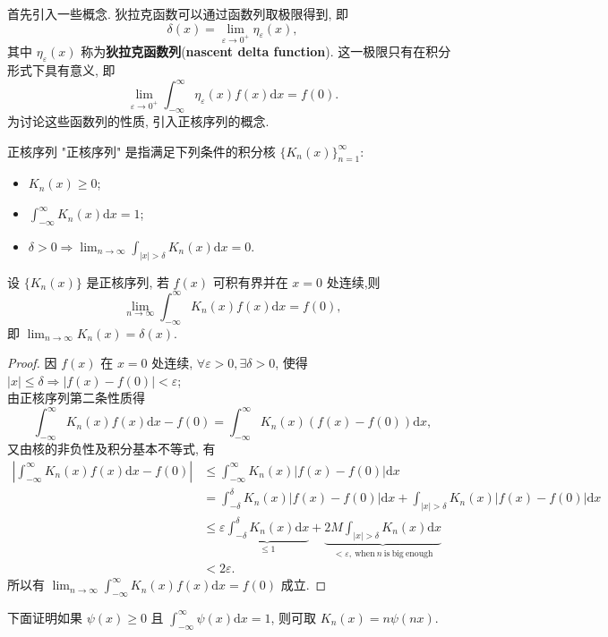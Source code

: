 首先引入一些概念. 狄拉克函数可以通过函数列取极限得到, 即
\begin{equation}
    \delta(x)=\lim_{\varepsilon\to 0^+}\eta_\varepsilon (x),
\end{equation}
其中 $\eta_\varepsilon(x)$ 称为\textbf{狄拉克函数列}(\textbf{nascent delta function}). 这一极限只有在积分形式下具有意义, 即
\begin{equation}
    \lim_{\varepsilon\to 0^+}\int_{-\infty}^{\infty}\eta_\varepsilon(x)f(x)\mathrm{d}x=f(0).
\end{equation} 
为讨论这些函数列的性质, 引入正核序列的概念.
\begin{definition}{正核序列}{}
    "正核序列" 是指满足下列条件的积分核 $\displaystyle{\{ K_n(x) \}_{n=1}^\infty}$:
    \begin{itemize}
        \item $\displaystyle{K_n(x)\ge 0}$;
        \item $\displaystyle{\int_{-\infty}^\infty K_n(x)\mathrm{d}x=1}$;
        \item $\displaystyle{\delta>0\Rightarrow\lim_{n\to\infty}\int_{|x|>\delta}K_n(x)\mathrm{d}x=0}$.
    \end{itemize}
\end{definition}
\begin{theorem}{}{}
    设 $\{K_n(x)\}$ 是正核序列, 若 $f(x)$ 可积有界并在 $x=0$ 处连续,则
    \begin{equation}
        \lim_{n\to\infty}\int_{-\infty}^\infty K_n(x)f(x)\mathrm{d}x=f(0),
    \end{equation}
    即 $\displaystyle{\lim_{n\to \infty}K_n(x)=\delta(x)}$.
\end{theorem}
\begin{proof}{}{}
    因 $f(x)$ 在 $x=0$ 处连续, $\forall \varepsilon>0,\exists\delta>0$, 使得 $|x|\le \delta\Rightarrow|f(x)-f(0) |<\varepsilon$;
\\由正核序列第二条性质得
    \begin{equation}
        \int_{-\infty}^{\infty}K_n(x)f(x)\mathrm{d}x-f(0)=\int_{-\infty}^\infty K_n(x)\left( f(x)-f(0) \right) \mathrm{d}x,
    \end{equation}
    又由核的非负性及积分基本不等式, 有
      \begin{align}
            \left| \int_{-\infty}^\infty K_n(x)f(x)\mathrm{d}x-f(0) \right|&\leqslant \int_{-\infty}^{\infty}K_n(x)|f(x)-f(0) |\mathrm{d}x\nonumber\\
            &=\int_{-\delta}^\delta K_n(x)|f(x)-f(0) |\mathrm{d}x+\int_{|x|>\delta}K_n(x)|f(x)-f(0) |\mathrm{d}x\nonumber\\
            &\leqslant \varepsilon \underbrace{\int_{-\delta}^\delta K_n(x)\mathrm{d}x}_{\leqslant 1} +\underbrace{2M\int_{|x|>\delta}K_n(x)\mathrm{d}x}_{<\varepsilon,~ \mathrm{when~}n\mathrm{~is~big~enough}}\nonumber\\
            &<2\varepsilon.
        \end{align}
    所以有 $\displaystyle{\lim_{n\to\infty}\int_{-\infty}^\infty K_n(x)f(x)\mathrm{d}x=f(0)}$ 成立.
\end{proof}
下面证明如果 $\psi(x)\ge 0$ 且 $\displaystyle{\int_{-\infty}^\infty \psi(x)\mathrm{d}x=1}$, 则可取 $K_n(x)=n\psi(nx)$.

